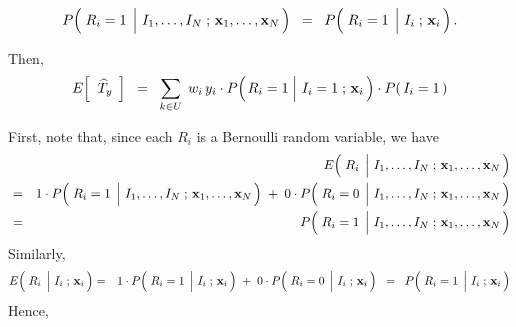 \begin{proposition}
\begin{itemize}
\begin{equation*}
	P\!\left(\,
		\left.\overset{{\color{white}.}}{R_{i}}=1\;\,\right\vert\,
		I_{1},\ldots,I_{N}\;;\,\mathbf{x}_{1},\ldots,\mathbf{x}_{N}
		\,\right)
	\;\; = \;\;
		P\!\left(\,\left.\overset{{\color{white}.}}{R_{i}}=1\;\,\right\vert\,I_{i}\;;\,\mathbf{x}_{i}\,\right).
	\end{equation*}
\end{itemize}
Then,
\begin{equation*}
E\!\left[\;\;\widehat{T}_{y}\;\,\right]
\;\; = \;\;
	\underset{k \in U}{\sum}\;\,w_{i}\,y_{i}
	\cdot P\!\left(\left.\overset{{\color{white}.}}{R_{i}}=1\;\right\vert\,I_{i}=1\;;\,\mathbf{x}_{i}\,\right) 
	\cdot P(\,I_{i}=1\,)
\end{equation*}
\end{proposition}
\proof
First, note that, since each $R_{i}$ is a Bernoulli random variable, we have
\begin{eqnarray*}
&&
	E\!\left(\,
	\left.\overset{{\color{white}.}}{R_{i}}\;\,\right\vert\,
	I_{1},\ldots,I_{N}\;;\,\mathbf{x}_{1},\ldots,\mathbf{x}_{N}
	\,\right)
\\
& = &
	1 \cdot P\!\left(\,
		\left.\overset{{\color{white}.}}{R_{i}}=1\;\,\right\vert\,
		I_{1},\ldots,I_{N}\;;\,\mathbf{x}_{1},\ldots,\mathbf{x}_{N}
		\,\right)
	\; + \;
	0 \cdot P\!\left(\,
		\left.\overset{{\color{white}.}}{R_{i}}=0\;\,\right\vert\,
		I_{1},\ldots,I_{N}\;;\,\mathbf{x}_{1},\ldots,\mathbf{x}_{N}
		\,\right)
\\
& = &
	P\!\left(\,
		\left.\overset{{\color{white}.}}{R_{i}}=1\;\,\right\vert\,
		I_{1},\ldots,I_{N}\;;\,\mathbf{x}_{1},\ldots,\mathbf{x}_{N}
		\,\right)
\end{eqnarray*}
Similarly,
\begin{eqnarray*}
E\!\left(\,\left.\overset{{\color{white}.}}{R_{i}}\;\,\right\vert\,I_{i}\;;\,\mathbf{x}_{i}\,\right)
& = &
	1 \cdot P\!\left(\,\left.\overset{{\color{white}.}}{R_{i}}=1\;\,\right\vert\,I_{i}\;;\,\mathbf{x}_{i}\,\right)
	\; + \;
	0 \cdot P\!\left(\,\left.\overset{{\color{white}.}}{R_{i}}=0\;\,\right\vert\,I_{i}\;;\,\mathbf{x}_{i}\,\right)
\;\; = \;\;
	P\!\left(\,\left.\overset{{\color{white}.}}{R_{i}}=1\;\,\right\vert\,I_{i}\;;\,\mathbf{x}_{i}\,\right)
\end{eqnarray*}
Hence,
